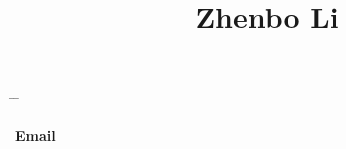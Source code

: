 

\title{Zhenbo Li} %

\parbox[c][3em][t]{0.9\textwidth}{ %
	\begin{tabbing} %
		\hspace{3cm} \= \hspace{4cm} \= \kill %
		
{\bf Email} \> 
		
	\end{tabbing}
}

